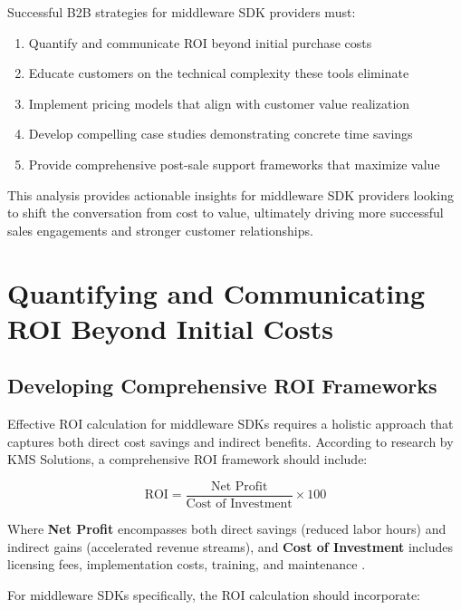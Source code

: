 \documentclass[11pt,a4paper]{article}
\begin{document}
Successful B2B strategies for middleware SDK providers must:

\begin{enumerate}
    \item Quantify and communicate ROI beyond initial purchase costs
    \item Educate customers on the technical complexity these tools eliminate
    \item Implement pricing models that align with customer value realization
    \item Develop compelling case studies demonstrating concrete time savings
    \item Provide comprehensive post-sale support frameworks that maximize value
\end{enumerate}

This analysis provides actionable insights for middleware SDK providers looking to shift the conversation from cost to value, ultimately driving more successful sales engagements and stronger customer relationships.

\section{Quantifying and Communicating ROI Beyond Initial Costs}

\subsection{Developing Comprehensive ROI Frameworks}

Effective ROI calculation for middleware SDKs requires a holistic approach that captures both direct cost savings and indirect benefits. According to research by KMS Solutions, a comprehensive ROI framework should include:

\begin{equation}
\text{ROI} = \frac{\text{Net Profit}}{\text{Cost of Investment}} \times 100
\end{equation}

Where \textbf{Net Profit} encompasses both direct savings (reduced labor hours) and indirect gains (accelerated revenue streams), and \textbf{Cost of Investment} includes licensing fees, implementation costs, training, and maintenance \cite{kms2023}.

For middleware SDKs specifically, the ROI calculation should incorporate:
\end{document}
